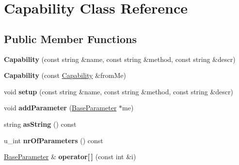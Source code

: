 \hypertarget{classrrp_1_1_capability}{\section{Capability Class Reference}
\label{classrrp_1_1_capability}
}
\subsection*{Public Member Functions}
\begin{DoxyCompactItemize}
\item 
\hypertarget{classrrp_1_1_capability_aea8437e8c3aeb29b50042afa7d7755e2}{{\bfseries Capability} (const string \&name, const string \&method, const string \&descr)}\label{classrrp_1_1_capability_aea8437e8c3aeb29b50042afa7d7755e2}

\item 
\hypertarget{classrrp_1_1_capability_a7324ee5b3d7761f53d164cf7035aacaa}{{\bfseries Capability} (const \hyperlink{classrrp_1_1_capability}{Capability} \&from\-Me)}\label{classrrp_1_1_capability_a7324ee5b3d7761f53d164cf7035aacaa}

\item 
\hypertarget{classrrp_1_1_capability_aea95ead441342ff78a0d7de607191da6}{void {\bfseries setup} (const string \&name, const string \&method, const string \&descr)}\label{classrrp_1_1_capability_aea95ead441342ff78a0d7de607191da6}

\item 
\hypertarget{classrrp_1_1_capability_a3c9da30917f0f494456d037ed84af0a9}{void {\bfseries add\-Parameter} (\hyperlink{classrrp_1_1_base_parameter}{Base\-Parameter} $\ast$me)}\label{classrrp_1_1_capability_a3c9da30917f0f494456d037ed84af0a9}

\item 
\hypertarget{classrrp_1_1_capability_a1597391adafcdb392650d766134cad71}{string {\bfseries as\-String} () const }\label{classrrp_1_1_capability_a1597391adafcdb392650d766134cad71}

\item 
\hypertarget{classrrp_1_1_capability_ad9d04ef2716cdedbb9b5799fb66e2a1f}{u\-\_\-int {\bfseries nr\-Of\-Parameters} () const }\label{classrrp_1_1_capability_ad9d04ef2716cdedbb9b5799fb66e2a1f}

\item 
\hypertarget{classrrp_1_1_capability_aaf049d1d25bb23dc371720df86b37a9f}{\hyperlink{classrrp_1_1_base_parameter}{Base\-Parameter} \& {\bfseries operator\mbox{[}$\,$\mbox{]}} (const int \&i)}\label{classrrp_1_1_capability_aaf049d1d25bb23dc371720df86b37a9f}


\end{DoxyCompactItemize}
